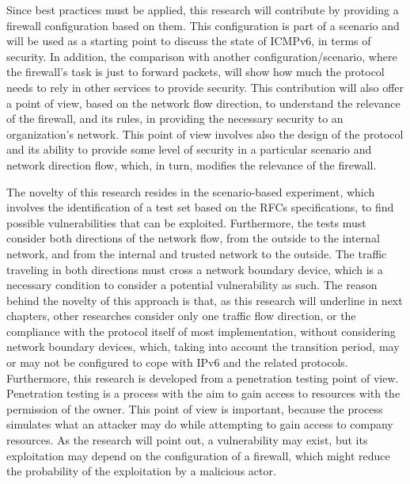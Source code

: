 \documentclass[12pt]{article}
\begin{document}
Since best practices must be applied, this research will contribute by providing a firewall configuration based on them. This configuration is part of a scenario and will be used as a starting point to discuss the state of ICMPv6, in terms of security. In addition, the comparison with another configuration/scenario, where the firewall's task is just to forward packets, will show how much the protocol needs to rely in other services to provide security. This contribution will also offer a point of view, based on the network flow direction, to understand the relevance of the firewall, and its rules, in providing the necessary security to an organization's network. This point of view involves also the design of the protocol and its ability to provide some level of security in a particular scenario and network direction flow, which, in turn, modifies the relevance of the firewall.

The novelty of this research resides in the scenario-based experiment, which involves the identification of a test set based on the RFCs specifications, to find possible vulnerabilities that can be exploited. Furthermore, the tests must consider both directions of the network flow, from the outside to the internal network, and from the internal and trusted network to the outside. The traffic traveling in both directions must cross a network boundary device, which is a necessary condition to consider a potential vulnerability as such. The reason behind the novelty of this approach is that, as this research will underline in next chapters, other researches consider only one traffic flow direction, or the compliance with the protocol itself of most implementation, without considering network boundary devices, which, taking into account the transition period, may or may not be configured to cope with IPv6 and the related protocols. Furthermore, this research is developed from a penetration testing point of view. Penetration testing is a process with the aim to gain access to resources with the permission of the owner\cite{penTesting}. This point of view is important, because the process simulates what an attacker may do while attempting to gain access to company resources. As the research will point out, a vulnerability may exist, but its exploitation may depend on the configuration of a firewall, which might reduce the probability of the exploitation by a malicious actor.
\end{document}
